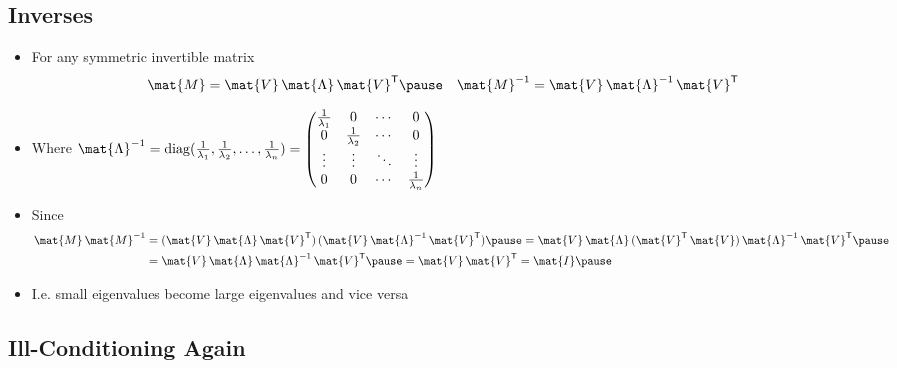 
\begin{slide}
\section[-2]{Inverses}

\begin{PauseHighLight}
  \begin{itemize}
  \item For any symmetric invertible matrix
    \begin{align*}
      \mat{M} &=\mat{V}\,\mat{\Lambda}\,\mat{V}^\tr \pause &
      \mat{M}^{-1} &=\mat{V}\,\mat{\Lambda}^{-1}\,\mat{V}^\tr
    \end{align*}
  \item Where $\mat{\Lambda}^{-1} = \diag(\tfrac{1}{\lambda_1},
    \tfrac{1}{\lambda_2}, \ldots, \tfrac{1}{\lambda_n}) =
    \begin{pmatrix}
      \tfrac{1}{\lambda_1} & 0 & \cdots & 0 \\
      0 & \tfrac{1}{\lambda_2}  & \cdots & 0 \\
      \vdots & \vdots &\ddots &\vdots \\
      0 & 0 & \cdots & \tfrac{1}{\lambda_n}
    \end{pmatrix}$\pause
  \item Since
    \begin{align*}
       \mat{M}\,\mat{M}^{-1} &= (\mat{V}\,\mat{\Lambda}\,\mat{V}^\tr)\,
       (\mat{V}\,\mat{\Lambda}^{-1}\,\mat{V}^\tr)\pause
       = \mat{V}\,\mat{\Lambda}\,(\mat{V}^\tr\,
       \mat{V})\,\mat{\Lambda}^{-1}\,\mat{V}^\tr\pause \\
       &= \mat{V}\,\mat{\Lambda}\,\mat{\Lambda}^{-1}\,\mat{V}^\tr\pause
       = \mat{V}\,\mat{V}^\tr = \mat{I}\pause
    \end{align*}
  \item I.e.{} small eigenvalues become large eigenvalues and vice versa\pause
  \end{itemize}
\end{PauseHighLight}

\end{slide}


\begin{slide}
\section[-1.5]{Ill-Conditioning Again}

\pb\pause{}
\begin{center}
  \pause
\end{center}

\end{slide}

